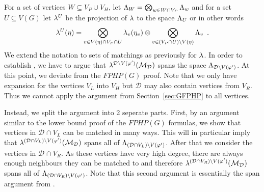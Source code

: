 \documentclass{theoretics}
\newcommand{\eqperiod}{\enspace .}
\newcommand{\refsec}[1]{Section~\ref{#1}}
\newcommand{\formulaformat}[1]{\mathit{#1}}
\newcommand{\graphfphpnot}[1][G]{\formulaformat{FPHP}({#1})}
\newcommand{\GFPHP}{G\text{-}FPHP}
\renewcommand{\GFPHP}{\graphfphpnot[G]}
\newcommand{\V}[1][]{V_{#1}}
\newcommand{\Vl}{\V[L]}
\newcommand{\Vr}{\V[R]}
\newcommand{\Vp}{\V[P]}
\newcommand{\Vh}{\V[H]}
\newcommand{\linspace}[1][]{\ensuremath \Lambda_{{#1}}}
\newcommand{\linmap}[1][]{\ensuremath \lambda_{{#1}}}
\newcommand{\linmapof}[2][]{\linmap[#1](#2)}
\newcommand{\linmapl}[2][]{\ensuremath \lambda^{{#2}}_{{#1}}}
\newcommand{\linmaplof}[3][]{\linmapl[#1]{#2}(#3)}
\newcommand{\diffclosure}[1][]{D_{{#1}}}
\renewcommand{\diffclosure}[1][]{\mathcal{D}_{{#1}}}
\newcommand{\vmatch}[1]{V(#1)}
\newcommand{\matchb}{\varphi'}
\newcommand{\matche}{\eta}
\newcommand{\matchings}[1][]{\ensuremath \mathcal{M}_{{#1}}}
\newcommand{\tensor}{\ensuremath \otimes}
\newcommand{\bigtensor}{\ensuremath \bigotimes}
\numberwithin{equation}{section}
\begin{document}
  For a set of vertices
  $W \subseteq \Vp \cup \Vh$, let
  $
    \linspace[W] = 
    \bigtensor_{w \in W \cap \Vp}
    \linspace[w] $ 
  and 
  for a set $U \subseteq V(G)$
  let $\linmapl{U}$ be the projection of $\linmap$ to the space
  $\linspace[U]$ or in other words
  \begin{align}
    \linmaplof{U}{\matche} = 
    \bigtensor_{v \in V(\matche) \cap \Vp \cap U}
    \linmapof[v]{\matche_v} \tensor \bigtensor_{v \in (\Vp \cap U)
    \setminus V(\matche)} \linspace[v] \eqperiod
  \end{align}
  We extend the notation to sets of matchings as previously 
  for $\linmap$.
  In order to establish , we have to argue that 
  $\linmaplof{\diffclosure \setminus
    V(\matchb)}{\matchings[\diffclosure]}$ 
  spans the space 
  $\linspace[\diffclosure \setminus \vmatch{\matchb}]$.
  At this point, we deviate from the $\GFPHP$ proof.
  Note that we only have expansion for the vertices $\Vl$ into $\Vh$
  but $\diffclosure$ may also contain vertices from $\Vr$. Thus we
  cannot apply the argument from \refsec{sec:GFPHP} to all vertices. 

  Instead, we split the argument into 2 seperate parts.
  First, by an argument similar to the lower bound proof of the
  $\GFPHP$ formulas, we show that vertices in $\diffclosure \cap \Vl$ 
  can be matched in many ways. This will in particular imply that 
  $\linmaplof{(\diffclosure \cap \Vl) \setminus V(\matchb)}
  {\matchings[\diffclosure]}$ spans all of
  $\linspace[(\diffclosure \cap \Vl) \setminus \vmatch{\matchb}]$. 
  After that we consider the vertices in $\diffclosure \cap \Vr$. 
  As these
  vertices have very high degree, there are always enough
  neighbours they can be matched to and therefore
  $\linmaplof{(\diffclosure \cap \Vr) \setminus \vmatch{\matchb}}
  {\matchings[\diffclosure]}$ spans all of
  $\linspace[(\diffclosure \cap \Vr) \setminus \vmatch{\matchb}]$. 
  Note that this second argument is essentially the span argument from
  \cite{Razborov03ResolutionLowerBoundsWFPHP}.
  
\end{document}
